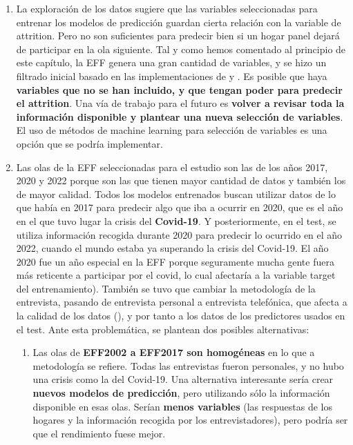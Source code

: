 \begin{enumerate}
    \item La exploración de los datos sugiere que las variables seleccionadas para entrenar los modelos de predicción guardan cierta relación con la variable de attrition. Pero no son suficientes para predecir bien si un hogar panel dejará de participar en la ola siguiente. Tal y como hemos comentado al principio de este capítulo, la EFF genera una gran cantidad de variables, y se hizo un filtrado inicial basado en las implementaciones de \cite{beste2023case} y \cite{kern2021predicting}. Es posible que haya \textbf{variables que no se han incluido, y que tengan poder para predecir el attrition}. Una vía de trabajo para el futuro es \textbf{volver a revisar toda la información disponible y plantear una nueva selección de variables}. El uso de métodos de machine learning para selección de variables es una opción que se podría implementar.
    \item Las olas de la EFF seleccionadas para el estudio son las de los años 2017, 2020 y 2022 porque son las que tienen mayor cantidad de datos y también los de mayor calidad. Todos los modelos entrenados buscan utilizar datos de lo que había en 2017 para predecir algo que iba a ocurrir en 2020, que es el año en el que tuvo lugar la crisis del \textbf{Covid-19}. Y posteriormente, en el test, se utiliza información recogida durante 2020 para predecir lo ocurrido en el año 2022, cuando el mundo estaba ya superando la crisis del Covid-19. El año 2020 fue un año especial en la EFF porque seguramente mucha gente fuera más reticente a participar por el covid, lo cual afectaría a la variable target del entrenamiento). También se tuvo que cambiar la metodología de la entrevista, pasando de entrevista personal a entrevista telefónica, que afecta a la calidad de los datos (\cite{lynn2018tackling}), y por tanto a los datos de los predictores usados en el test. Ante esta problemática, se plantean dos posibles alternativas:
    \begin{enumerate}
        \item Las olas de \textbf{EFF2002 a EFF2017 son homogéneas} en lo que a metodología se refiere. Todas las entrevistas fueron personales, y no hubo una crisis como la del Covid-19. Una alternativa interesante sería crear \textbf{nuevos modelos de predicción}, pero utilizando sólo la información disponible en esas olas. Serían \textbf{menos variables} (las respuestas de los hogares y la información recogida por los entrevistadores), pero podría ser que el rendimiento fuese mejor.

\end{enumerate}
\end{enumerate}
